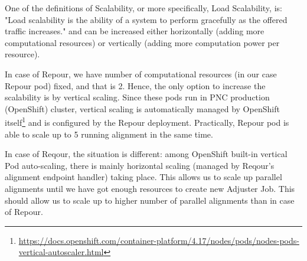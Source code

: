 \documentclass[../main.tex]{subfiles}
\begin{document}
One of the definitions of Scalability, or more specifically, Load Scalability, is: "Load scalability is the ability of a system to perform gracefully as the offered traffic increases."\cite{scalability} and can be increased either horizontally (adding more computational resources) or vertically (adding more computation power per resource).

In case of Repour, we have number of computational resources (in our case Repour pod) fixed, and that is 2. Hence, the only option to increase the scalability is by vertical scaling. Since these pods run in PNC production (OpenShift) cluster, vertical scaling is automatically managed by OpenShift itself\footnote{\url{https://docs.openshift.com/container-platform/4.17/nodes/pods/nodes-pods-vertical-autoscaler.html}} and is configured by the Repour deployment. Practically, Repour pod is able to scale up to 5 running alignment in the same time.

In case of Reqour, the situation is different: among OpenShift built-in vertical Pod auto-scaling, there is mainly horizontal scaling (managed by Reqour's alignment endpoint handler) taking place. This allows us to scale up parallel alignments until we have got enough resources to create new Adjuster Job. This should allow us to scale up to higher number of parallel alignments than in case of Repour.
\end{document}
